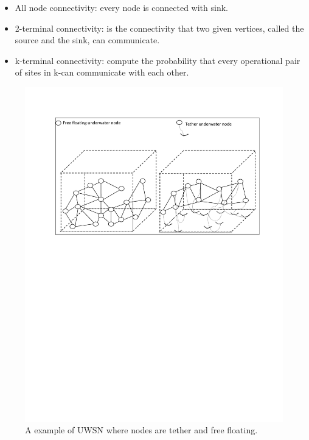 \documentclass[12pt]{article}
\begin{document}
\begin{itemize}[noitemsep,nolistsep]
\item All node connectivity: every node is connected with sink.
\item 2-terminal connectivity: is the connectivity that two given vertices, called the source and the
sink, can communicate.
\item k-terminal connectivity: compute the probability that every operational pair of sites in k-can communicate
with each other.
\end{itemize}
 \begin{figure}[h]
 
\centering
\includegraphics[width=6 in, height=2.5 in]{Figure1.pdf}
 \caption{A example of UWSN where nodes are  tether and free floating.
}
\label{Fig:Exf1}
\end{figure}
\end{document}
